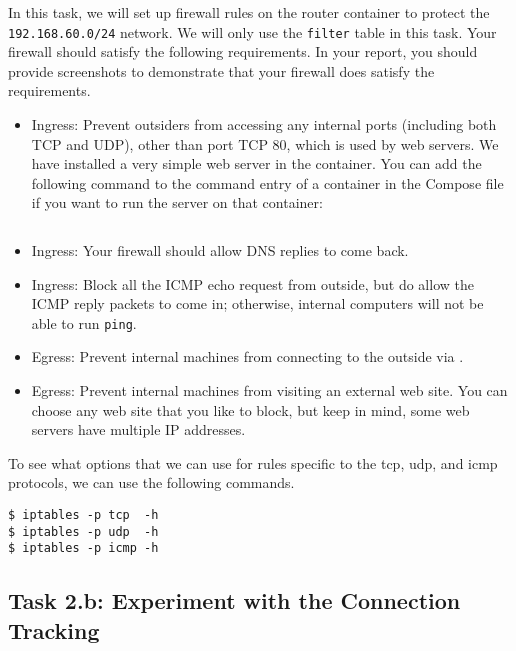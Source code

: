 In this task, we will set up firewall rules on the router container
to protect the \texttt{192.168.60.0/24} network. We will only use 
the \texttt{filter} table in this task.  
Your firewall should satisfy the following requirements. 
In your report, you should provide screenshots to demonstrate 
that your firewall does satisfy the requirements.


\begin{itemize}
\item Ingress: Prevent outsiders from accessing any internal ports (including
both TCP and UDP), other than port TCP 80, which is used by web servers. 
We have installed a very simple web server in the container. You can
add the following command to the command entry of a container
in the Compose file if you want to run the server on that container:

\begin{lstlisting}
\end{lstlisting}
 
\item Ingress: Your firewall should allow DNS replies to come back. 

\item Ingress: Block all the ICMP echo request from outside, but 
do allow the ICMP reply packets to come in; otherwise, internal 
computers will not be able to run \texttt{ping}.  

\item Egress: Prevent internal machines from connecting to the outside via \telnet.

\item Egress: Prevent internal machines from visiting an external web site. 
You can choose any web site that you like to block, but keep in mind, 
some web servers have multiple IP addresses. 

\end{itemize}


To see what options that we can use for rules specific to the tcp, udp, and 
icmp protocols, we can use the following commands. 

\begin{lstlisting}
$ iptables -p tcp  -h
$ iptables -p udp  -h
$ iptables -p icmp -h
\end{lstlisting}
 


\subsection{Task 2.b: Experiment with the Connection Tracking} 



